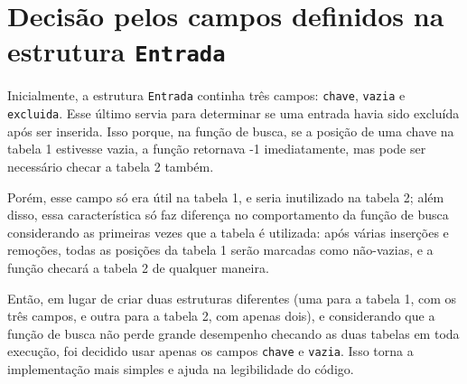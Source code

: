 \documentclass[a4paper, 11pt]{article}
\begin{document}
\section{Decisão pelos campos definidos na estrutura \texttt{Entrada}}
Inicialmente, a estrutura \texttt{Entrada} continha três campos: \texttt{chave},
\texttt{vazia} e \texttt{excluida}. Esse último servia para determinar se uma entrada
havia sido excluída após ser inserida. Isso porque, na função de busca, se a posição
de uma chave na tabela 1 estivesse vazia, a função retornava -1 imediatamente, mas
pode ser necessário checar a tabela 2 também.

Porém, esse campo só era útil na tabela 1, e seria inutilizado na tabela 2; além disso,
essa característica só faz diferença no comportamento da função de busca considerando
as primeiras vezes que a tabela é utilizada: após várias inserções e remoções, todas
as posições da tabela 1 serão marcadas como não-vazias, e a função checará a tabela 2
de qualquer maneira.

Então, em lugar de criar duas estruturas diferentes (uma para a tabela 1, com os três
campos, e outra para a tabela 2, com apenas dois), e considerando que a função de busca
não perde grande desempenho checando as duas tabelas em toda execução, foi decidido
usar apenas os campos \texttt{chave} e \texttt{vazia}. Isso torna a implementação mais
simples e ajuda na legibilidade do código.
\end{document}
